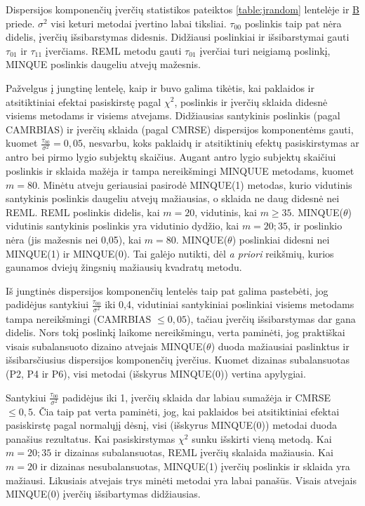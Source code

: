 \documentclass[11pt,a4paper]{article}
\begin{document}
\indent Dispersijos komponenčių įverčių statistikos pateiktos \ref{table:jrandom} lentelėje ir  \hyperlink{appendixb}{B} priede. $\sigma^2$ visi keturi metodai įvertino labai tiksliai. $\tau_{00}$ poslinkis taip pat nėra didelis, įverčių išsibarstymas didesnis. Didžiausi poslinkiai ir išsibarstymai gauti $\tau_{01}$ ir $\tau_{11}$ įverčiams. REML metodu gauti $\tau_{01}$ įverčiai turi neigiamą poslinkį, MINQUE poslinkis daugeliu atvejų mažesnis.

\indent Pažvelgus į jungtinę lentelę, kaip ir buvo galima tikėtis, kai paklaidos ir atsitiktiniai efektai pasiskirstę pagal $\chi^2$, poslinkis ir įverčių sklaida didesnė visiems metodams ir visiems atvejams. Didžiausias santykinis poslinkis (pagal CAMRBIAS) ir įverčių sklaida (pagal CMRSE) dispersijos komponentėms gauti, kuomet $\frac{\tau_{00}}{\sigma^2}=0,05$, nesvarbu, koks paklaidų ir atsitiktinių efektų pasiskirstymas ar antro bei pirmo lygio subjektų skaičius. Augant antro lygio subjektų skaičiui poslinkis ir sklaida mažėja ir tampa nereikšmingi MINQUUE metodams, kuomet $m=80$. Minėtu atveju geriausiai pasirodė MINQUE(1) metodas, kurio vidutinis santykinis poslinkis daugeliu atvejų mažiausias, o sklaida ne daug didesnė nei REML. REML poslinkis didelis, kai $m=20$, vidutinis, kai $m\geq35$. MINQUE($\theta$) vidutinis santykinis poslinkis yra vidutinio dydžio, kai $m=20;35$, ir poslinkio nėra (jis mažesnis nei 0,05), kai $m=80$. MINQUE($\theta$) poslinkiai didesni nei MINQUE(1) ir MINQUE(0). Tai galėjo nutikti, dėl \textit{a priori} reikšmių, kurios gaunamos dviejų žingsnių mažiausių kvadratų metodu.

\indent Iš jungtinės dispersijos komponenčių lentelės taip pat galima pastebėti, jog padidėjus santykiui $\frac{\tau_{00}}{\sigma^2}$ iki 0,4, vidutiniai santykiniai poslinkiai visiems metodams tampa nereikšmingi (CAMRBIAS $\leq 0,05$), tačiau įverčių išsibarstymas dar gana didelis. Nors tokį poslinkį laikome nereikšmingu, verta paminėti, jog praktiškai visais subalansuoto dizaino atvejais MINQUE($\theta$) duoda mažiausiai paslinktus ir išsibarsčiusius dispersijos komponenčių įverčius. Kuomet dizainas subalansuotas (P2, P4 ir P6), visi metodai (išskyrus MINQUE(0)) vertina apylygiai.

\indent Santykiui $\frac{\tau_{00}}{\sigma^2}$ padidėjus iki 1, įverčių sklaida dar labiau sumažėja ir CMRSE $\leq 0,5$. Čia taip pat verta paminėti, jog, kai paklaidos bei atsitiktiniai efektai pasiskirstę pagal normalųjį dėsnį, visi (išskyrus MINQUE(0)) metodai duoda panašius rezultatus. Kai pasiskirstymas $\chi^2$ sunku išskirti vieną metodą. Kai $m=20;35$ ir dizainas subalansuotas,  REML įverčių skalaida mažiausia. Kai $m=20$ ir dizainas nesubalansuotas, MINQUE(1) įverčių poslinkis ir sklaida yra mažiausi. Likusiais atvejais trys minėti metodai yra labai panašūs. Visais atvejais MINQUE(0) įverčių išsibartymas didžiausias.
\end{document}
